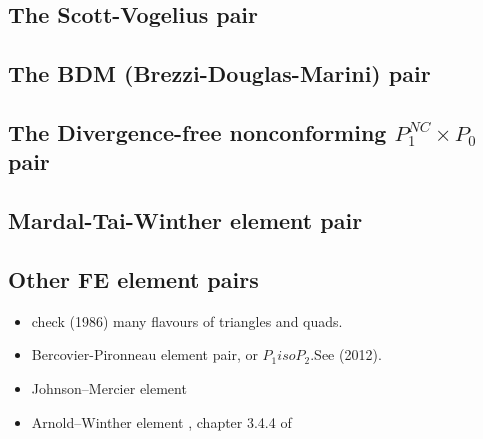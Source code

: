\newpage
\subsection{The Scott-Vogelius pair} \label{ss:scott_vogelius}


\subsection{The BDM (Brezzi-Douglas-Marini) pair} \label{ss:bdm}


\subsection{The Divergence-free nonconforming ${ P}_1^{NC}\times P_0$ pair} \label{ss:p1ncp0}



\subsection{Mardal-Tai-Winther element pair} \label{ss:pairmtw}




\subsection{Other FE element pairs}

\begin{itemize}

\item check \textcite{dhhu86} (1986) many flavours of triangles and quads.

\item Bercovier-Pironneau element pair, or $P_1isoP_2$.See \textcite{bocg12} (2012).

\item Johnson–Mercier element \cite{aubb17}

\item Arnold–Winther element \cite{aubb17}, chapter 3.4.4 of \cite{lomw12}

\end{itemize}



